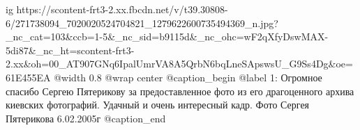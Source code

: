  
 
 
 
 

\ifcmt
  ig https://scontent-frt3-2.xx.fbcdn.net/v/t39.30808-6/271738094_7020020524704821_1279622600735494369_n.jpg?_nc_cat=103&ccb=1-5&_nc_sid=b9115d&_nc_ohc=wF2qXfyDswMAX-5di87&_nc_ht=scontent-frt3-2.xx&oh=00_AT907GNq6IpalUmrVA8A5QrbN6bqLneSApswsU_G9Ss4Dg&oe=61E455EA
	@width 0.8
	@wrap center
	@caption_begin
		@label 1:
Огромное спасибо Сергею Пятерикову за предоставленное фото из его
драгоценного архива киевских фотографий. Удачный и очень интересный кадр.
Фото Сергея Пятерикова 6.02.2005г
	@caption_end
\fi

